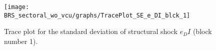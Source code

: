\begin{figure}[H]
\centering
  \texttt{[image: BRS\_sectoral\_wo\_vcu/graphs/TracePlot\_SE\_e\_DI\_blck\_1]}\\
    \caption{Trace plot for the standard deviation of structural shock ${e_DI}$ (block number 1).}
\end{figure}
